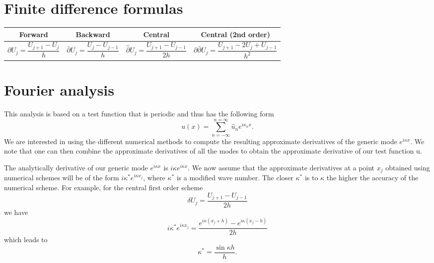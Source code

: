 \documentclass[oneside,a4paper,11pt]{report}
\begin{document}
\section{Finite difference formulas}
\begin{center}
\begin{tabular}{|c|c|c|c|}
\hline
Forward & Backward & Central & Central (2nd order)\\
\hline
\parbox{3cm}{\[\partial U_j = \frac{U_{j+1} - U_{j}}{h}\]} &
\parbox{3cm}{\[\bar{\partial} U_j = \frac{U_{j} - U_{j-1}}{h}\]} & 
\parbox{4cm}{\[\hat{\partial} U_j = \frac{U_{j+1} - U_{j-1}}{2h}\]} &
\parbox{5cm}{\[\partial \bar{\partial} U_j = \frac{U_{j+1} - 2U_j + U_{j-1}}{h^2}\]}\\
\hline
\end{tabular}
\end{center}

\section{Fourier analysis}
This analysis is based on a test function that is periodic and thus has the following form
\begin{equation}
    u(x) = \sum_{n = -\infty}^{n=\infty} \hat{u}_n e^{i \kappa_n x}.
\end{equation}
We are interested in using the different numerical methods to compute the resulting approximate derivatives of the generic mode $e^{i \kappa x}$. We note that one can then combine the approximate derivatives of all the modes to obtain the approximate derivative of our test function u.

The analytically derivative of our generic mode $e^{i\kappa x}$ is $i\kappa e^{i\kappa x}$. We now assume that the approximate derivatives at a point $x_j$ obtained using numerical schemes will be of the form $i\kappa^* e^{i\kappa x_j}$, where $\kappa^*$ is a modified wave number. The closer $\kappa^*$ is to $\kappa$ the higher the accuracy of the numerical scheme. For example, for the central first order scheme 
\begin{equation}
\delta U_j = \frac{ U_{j+1} - U_{j-1} }{ 2h }
\end{equation}
we have
\begin{equation}
    i\kappa^*e^{i\kappa x_j} = \frac{ e^{i\kappa (x_j+h) } - e^{ i \kappa (x_j-h)  } }{2h}
\end{equation}
which leads to
\begin{equation}
    \kappa^* = \frac{ \sin \kappa h }{h}.
\end{equation}
\end{document}

